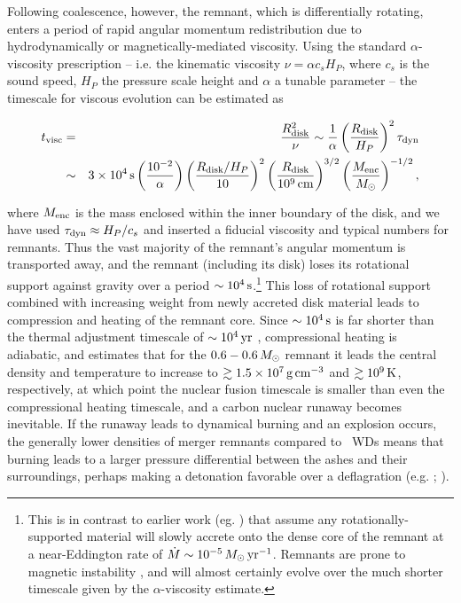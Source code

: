 Following coalescence, however, the remnant, which is differentially rotating, enters a period of rapid angular momentum redistribution due to hydrodynamically or magnetically-mediated viscosity.  Using the standard $\alpha$-viscosity prescription \citep{shaks73} -- i.e. the kinematic viscosity $\nu = \alpha c_s H_P$, where $c_s$ is the sound speed, $H_P$ the pressure scale height and $\alpha$ a tunable parameter -- the timescale for viscous evolution can be estimated as \citep{shen+12}

\begin{eqnarray}
t_\mrm{visc} &=& \frac{R_\mrm{disk}^2}{\nu} \sim \frac{1}{\alpha}\left(\frac{R_\mrm{disk}}{H_P}\right)^2\taudyn \nonumber \\
			&\sim& 3\times10^4\,\mrm{s}\left(\frac{10^{-2}}{\alpha}\right)\left(\frac{R_\mrm{disk}/H_P}{10}\right)^2\left(\frac{R_\mrm{disk}}{10^9\,\mrm{cm}}\right)^{3/2}\left(\frac{M_\mrm{enc}}{\Msun}\right)^{-1/2},
\end{eqnarray}

\noindent where $M_\mathrm{enc}$ is the mass enclosed within the inner boundary of the disk, and we have used $\taudyn \approx H_P/c_s$ and inserted a fiducial viscosity and typical numbers for remnants.  Thus the vast majority of the remnant's angular momentum is transported away, and the remnant (including its disk) loses its rotational support against gravity over a period $\sim10^4\,\mathrm{s}$.\footnote{This is in contrast to earlier work (eg. \citealt{nomoi85, yoonpr07}) that assume any rotationally-supported material will slowly accrete onto the dense core of the remnant at a near-Eddington rate of $\dot{M} \sim 10^{-5}\,\Msun\,\pyr$.  Remnants are prone to magnetic instability \citep{shen+12,ji+13}, and will almost certainly evolve over the much shorter timescale given by the $\alpha$-viscosity estimate.}  This loss of rotational support combined with increasing weight from newly accreted disk material leads to compression and heating of the remnant core.  Since $\sim10^4\,\mathrm{s}$ is far shorter than the thermal adjustment timescale of $\sim10^4\,\mathrm{yr}$ \citep{shen+12}, compressional heating is adiabatic, and \citeal{vkercj10} estimates that for the $0.6-0.6\,\Msun$ remnant it leads the central density and temperature to increase to $\gtrsim1.5\times10^7\,\gcc$ and $\gtrsim10^9\,\mathrm{K}$, respectively, at which point the nuclear fusion timescale is smaller than even the compressional heating timescale, and a carbon nuclear runaway becomes inevitable.  If the runaway leads to dynamical burning and an explosion occurs, the generally lower densities of merger remnants compared to \Mch\ WDs means that burning leads to a larger pressure differential between the ashes and their surroundings, perhaps making a detonation favorable over a deflagration (e.g. \citealt{mazumw77}; \citealt{seit+09}).

